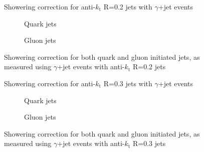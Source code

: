 \clearpage
\begin{figure}[!ht]
 \centering
 \caption[Showering correction for anti-$k_{\mathrm t}$ R=0.2 jets with $\gamma$+jet events]
 {\small Showering correction for anti-$k_{\mathrm t}$ R=0.2 jets with $\gamma$+jet events}
 \label{plot:GJetShowering2App}
\end{figure}

\begin{figure}[!ht]
 \centering
 \begin{subfigure}{.5\textwidth}
  \centering
  \caption{Quark jets}
 \end{subfigure}%
 \begin{subfigure}{.5\textwidth}
  \centering
  \caption{Gluon jets}
 \end{subfigure}
 \caption[Quark/gluon jet showering correction, anti-$k_{\mathrm t}$ R=0.2, $\gamma$+jet]
 {\small Showering correction for both quark and gluon initiated jets, as measured using $\gamma$+jet events with anti-$k_{\mathrm t}$ R=0.2 jets}
 \label{plot:GJetShoweringFlav2App}
\end{figure}

\clearpage
\begin{figure}[!ht]
 \centering
 \caption[Showering correction for anti-$k_{\mathrm t}$ R=0.3 jets with $\gamma$+jet events]
 {\small Showering correction for anti-$k_{\mathrm t}$ R=0.3 jets with $\gamma$+jet events}
 \label{plot:GJetShowering3App}
\end{figure}

\begin{figure}[!ht]
 \centering
 \begin{subfigure}{.5\textwidth}
  \centering
  \caption{Quark jets}
 \end{subfigure}%
 \begin{subfigure}{.5\textwidth}
  \centering
  \caption{Gluon jets}
 \end{subfigure}
 \caption[Quark/gluon jet showering correction, anti-$k_{\mathrm t}$ R=0.3, $\gamma$+jet]
 {\small Showering correction for both quark and gluon initiated jets, as measured using $\gamma$+jet events with anti-$k_{\mathrm t}$ R=0.3 jets}
 \label{plot:GJetShoweringFlav3App}
\end{figure}

